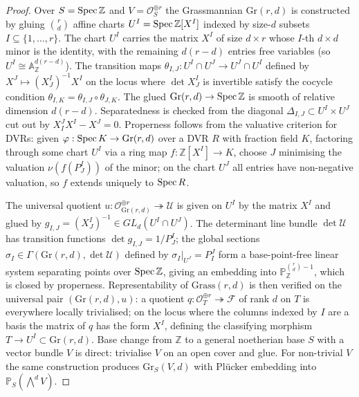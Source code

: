 \begin{proof}
  \leanok{}
  Over \(S = \operatorname{Spec} \mathbb{Z}\) and \(V = \mathcal{O}_S^{\oplus r}\) the
  Grassmannian \(\mathrm{Gr}(r, d)\) is constructed by gluing
  \(\binom{r}{d}\) affine charts \(U^I = \operatorname{Spec}\mathbb{Z}[X^I]\) indexed by
  size-\(d\) subsets \(I \subseteq \{1, \dots, r\}\). The chart \(U^I\)
  carries the matrix \(X^I\) of size \(d \times r\) whose \(I\)-th \(d \times d\)
  minor is the identity, with the remaining \(d(r-d)\) entries free
  variables (so \(U^I \cong \mathbb{A}^{d(r-d)}_{\mathbb{Z}}\)). The
  transition maps \(\theta_{I,J} : U^I \cap U^J \to U^J \cap U^I\) defined
  by \(X^J \mapsto (X^I_J)^{-1} X^I\) on the locus where \(\det X^I_J\) is
  invertible satisfy the cocycle condition
  \(\theta_{I,K} = \theta_{I,J} \circ \theta_{J,K}\). The glued
  \(\mathrm{Gr}(r,d) \to \operatorname{Spec}\mathbb{Z}\) is smooth of relative dimension
  \(d(r-d)\). Separatedness is checked from the diagonal
  \(\Delta_{I,J} \subset U^I \times U^J\) cut out by \(X^J_I X^I - X^J = 0\).
  Properness follows from the valuative criterion for DVRs: given
  \(\varphi : \operatorname{Spec} K \to \mathrm{Gr}(r,d)\) over a DVR \(R\) with fraction
  field \(K\), factoring through some chart \(U^I\) via a ring map
  \(f : \mathbb{Z}[X^I] \to K\), choose \(J\) minimising the valuation
  \(\nu(f(P^I_J))\) of the minor; on the chart \(U^J\) all entries have
  non-negative valuation, so \(f\) extends uniquely to \(\operatorname{Spec} R\).

  The universal quotient \(u : \mathcal{O}_{\mathrm{Gr}(r,d)}^{\oplus r}
  \twoheadrightarrow \mathcal{U}\) is given on \(U^I\) by the matrix \(X^I\)
  and glued by \(g_{I,J} = (X^I_J)^{-1} \in GL_d(U^I \cap U^J)\). The
  determinant line bundle \(\det\mathcal{U}\) has transition functions
  \(\det g_{I,J} = 1/P^I_J\); the global sections
  \(\sigma_I \in \Gamma(\mathrm{Gr}(r,d), \det\mathcal{U})\) defined by
  \(\sigma_I|_{U^J} = P^J_I\) form a base-point-free linear system separating
  points over \(\operatorname{Spec}\mathbb{Z}\), giving an embedding into
  \(\mathbb{P}^{\binom{r}{d}-1}_{\mathbb{Z}}\), which is closed by
  properness. Representability of \(\mathrm{Grass}(r,d)\) is then verified
  on the universal pair \((\mathrm{Gr}(r,d), u)\): a quotient
  \(q : \mathcal{O}_T^{\oplus r} \twoheadrightarrow \mathcal{F}\) of
  rank \(d\) on \(T\) is everywhere locally trivialised; on the locus where
  the columns indexed by \(I\) are a basis the matrix of \(q\) has the form
  \(X^I\), defining the classifying morphism \(T \to U^I \subset
  \mathrm{Gr}(r,d)\). Base change from \(\mathbb{Z}\) to a general noetherian
  base \(S\) with a vector bundle \(V\) is direct: trivialise \(V\) on an open
  cover and glue. For non-trivial \(V\) the same construction produces
  \(\mathrm{Gr}_S(V, d)\) with Pl\"ucker embedding into
  \(\mathbb{P}_S(\bigwedge^d V)\).
\end{proof}
